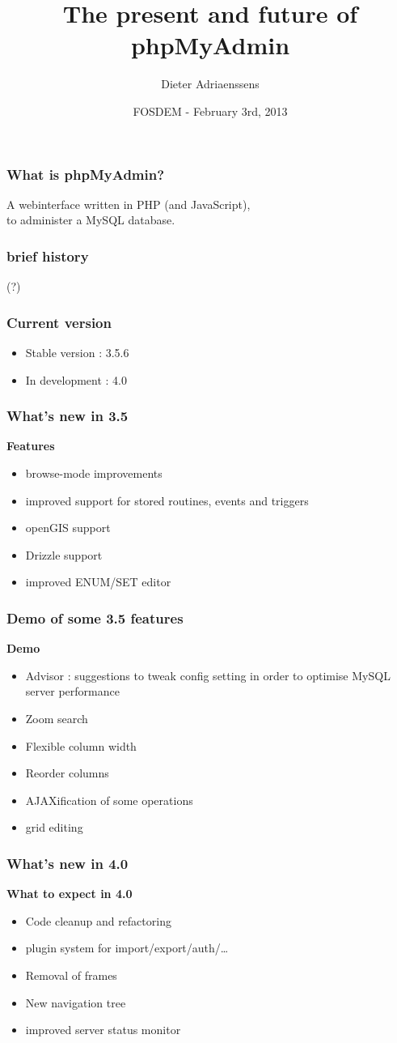 \documentclass[14pt]{beamer}
\title{The present and future of phpMyAdmin}
\author{Dieter Adriaenssens}
\institute[phpMyAdmin]{phpMyAdmin developer}
\date[FOSDEM - 3Feb2013]{FOSDEM - February 3rd, 2013}
\begin{document}
  \begin{frame}
  \titlepage
  \end{frame}
  \begin{frame}
    \frametitle{What is phpMyAdmin?}
      A webinterface written in PHP (and JavaScript),\\
      to administer a MySQL database.
  \end{frame}
  \begin{frame}
    \frametitle{brief history}
    (?)
  \end{frame}
  \begin{frame}
    \frametitle{Current version}
    \begin{itemize}[<+->]
      \item Stable version : 3.5.6
      \item In development : 4.0
    \end{itemize}
  \end{frame}
  \begin{frame}
    \frametitle{What's new in 3.5}
   \textbf{{\color{PmaOlive}Features}}
    \pause
    \begin{itemize}[<+->]
      \item browse-mode improvements
      \item improved support for stored routines, events and triggers
      \item openGIS support
      \item Drizzle support
      \item improved ENUM/SET editor
    \end{itemize}
  \end{frame}
  \begin{frame}
    \frametitle{Demo of some 3.5 features}
    \textbf{{\color{PmaOlive}Demo}}
    \begin{itemize}
      \item Advisor : suggestions to tweak config setting in order to optimise MySQL server performance
      \item Zoom search
      \item Flexible column width
      \item Reorder columns
      \item AJAXification of some operations
      \item grid editing
    \end{itemize}
  \end{frame}
  \begin{frame}
    \frametitle{What's new in 4.0}
    \textbf{{\color{PmaOlive}What to expect in 4.0}}
    \pause
    \begin{itemize}[<+->]
      \item Code cleanup and refactoring
      \item plugin system for import/export/auth/\ldots
      \item Removal of frames
      \item New navigation tree
      \item improved server status monitor
    \end{itemize}
  \end{frame}
\end{document}
